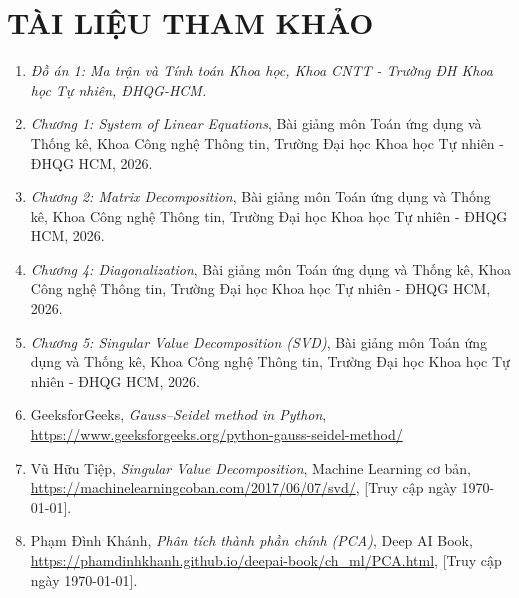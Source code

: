 \documentclass[a4paper,12pt]{article}
\begin{document}
\section{TÀI LIỆU THAM KHẢO}
\begin{enumerate}
    \item \textit{Đồ án 1: Ma trận và Tính toán Khoa học, Khoa CNTT - Trường ĐH Khoa học Tự nhiên, ĐHQG-HCM.}
    \item \textit{Chương 1: System of Linear Equations}, Bài giảng môn Toán ứng dụng và Thống kê, Khoa Công nghệ Thông tin, Trường Đại học Khoa học Tự nhiên - ĐHQG HCM, 2026.
    
    \item \textit{Chương 2: Matrix Decomposition}, Bài giảng môn Toán ứng dụng và Thống kê, Khoa Công nghệ Thông tin, Trường Đại học Khoa học Tự nhiên - ĐHQG HCM, 2026.
    
    \item \textit{Chương 4: Diagonalization}, Bài giảng môn Toán ứng dụng và Thống kê, Khoa Công nghệ Thông tin, Trường Đại học Khoa học Tự nhiên - ĐHQG HCM, 2026.
    
    \item \textit{Chương 5: Singular Value Decomposition (SVD)}, Bài giảng môn Toán ứng dụng và Thống kê, Khoa Công nghệ Thông tin, Trường Đại học Khoa học Tự nhiên - ĐHQG HCM, 2026.
    \item GeeksforGeeks, \textit{Gauss–Seidel method in Python}, \url{https://www.geeksforgeeks.org/python-gauss-seidel-method/}
    \item Vũ Hữu Tiệp, \textit{Singular Value Decomposition}, Machine Learning cơ bản, \url{https://machinelearningcoban.com/2017/06/07/svd/}, [Truy cập ngày \today].
    
    \item Phạm Đình Khánh, \textit{Phân tích thành phần chính (PCA)}, Deep AI Book, \url{https://phamdinhkhanh.github.io/deepai-book/ch_ml/PCA.html}, [Truy cập ngày \today].
\end{enumerate}
\end{document}

